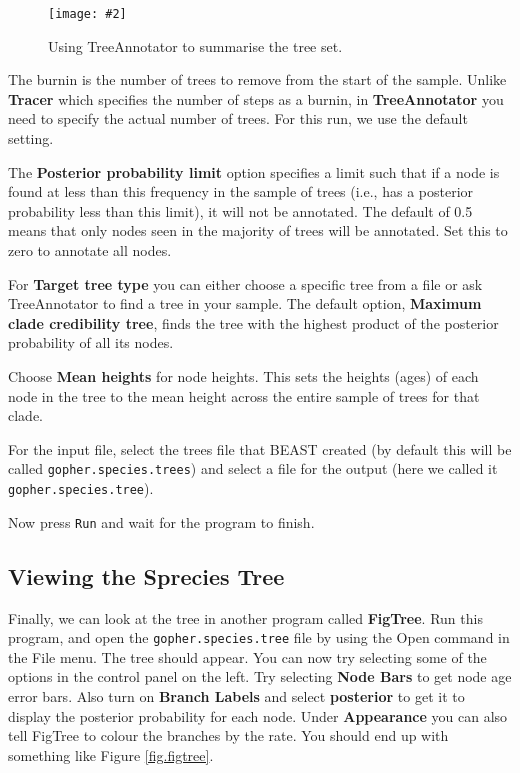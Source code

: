 \documentclass{article}
\newcommand{\includeimage}[2][]{%
\texttt{[image: \#2]}
}
\begin{document}
\begin{figure}
\centering
\includeimage[width=0.8\textwidth]{figures/TreeAnnotator}

\caption{\label{fig.TreeAnnotator} Using TreeAnnotator to summarise the tree set.}
\end{figure}


The burnin is the number of trees to remove from the start of the sample. Unlike {\bf Tracer} which specifies the number of steps as a burnin, in {\bf TreeAnnotator} you need to specify the actual number of trees. For this run, we use the default setting.

The {\bf Posterior probability limit} option specifies a limit such that if a node is found at less than this frequency in the sample of trees (i.e., has a posterior probability less than this limit), it will not be annotated. The default of 0.5 means that only nodes seen in the majority of trees will be annotated. Set this to zero to annotate all nodes.

For {\bf Target tree type} you can either choose a specific tree from a file or ask TreeAnnotator to find a tree in your sample. The default option, {\bf Maximum clade credibility tree}, finds the tree with the highest product of the posterior probability of all its nodes.

Choose {\bf Mean heights} for node heights. This sets the heights (ages) of each node in the tree to the mean height across the entire sample of trees for that clade.

For the input file, select the trees file that BEAST created (by default this will be called \texttt{gopher.species.trees}) and select a file for the output (here we called it \texttt{gopher.species.tree}).

Now press \texttt{Run} and wait for the program to finish.

\subsection*{Viewing the Sprecies Tree}

Finally, we can look at the tree in another program called {\bf FigTree}. Run this program, and open
the \texttt{gopher.species.tree} file by using the Open command in the File menu. The tree should appear.
You can now try selecting some of the options in the control panel on the left. Try selecting
{\bf Node Bars} to get node age error bars. Also turn on {\bf Branch Labels} and select {\bf posterior} to get
it to display the posterior probability for each node. Under {\bf Appearance} you can also tell FigTree
to colour the branches by the rate.
You should end up with something like Figure \ref{fig.figtree}.
\end{document}
